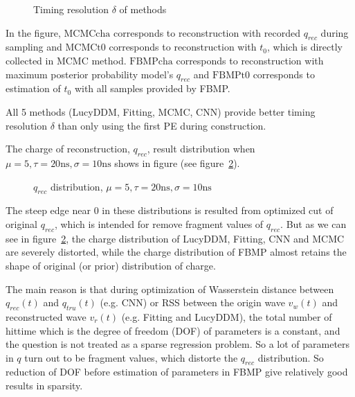 \begin{figure}[H]
    \centering
    \resizebox{\textwidth}{!}{}
    \caption{\label{fig:deltamethods} Timing resolution $\delta$ of methods}
\end{figure}

In the figure, $\mathrm{MCMCcha}$ corresponds to reconstruction with recorded $q_{rec}$ during sampling and $\mathrm{MCMCt0}$ corresponds to reconstruction with $t_{0}$, which is directly collected in MCMC method. $\mathrm{FBMPcha}$ corresponds to reconstruction with maximum posterior probability model's $q_{rec}$ and $\mathrm{FBMPt0}$ corresponds to estimation of $t_{0}$ with all samples provided by FBMP. 

All 5 methods (LucyDDM, Fitting, MCMC, CNN) provide better timing resolution $\delta$ than only using the first PE during construction. 


The charge of reconstruction, $q_{rec}$, result distribution when $\mu=5, \tau=20\mathrm{ns}, \sigma=10\mathrm{ns}$ shows in figure (see figure~\ref{fig:recchargehist}). 

\begin{figure}[H]
    \centering
    \resizebox{\textwidth}{!}{}
    \caption{\label{fig:recchargehist}  $q_{rec}$ distribution, $\mu=5, \tau=20\mathrm{ns}, \sigma=10\mathrm{ns}$}
\end{figure}

The steep edge near 0 in these distributions is resulted from optimized cut of original $q_{rec}$, which is intended for remove fragment values of $q_{rec}$. But as we can see in figure~\ref{fig:recchargehist}, the charge distribution of LucyDDM, Fitting, CNN and MCMC are severely distorted, while the charge distribution of FBMP almost retains the shape of original (or prior) distribution of charge. 

The main reason is that during optimization of Wasserstein distance between $q_{rec}(t)$ and $q_{tru}(t)$ (e.g. CNN) or RSS between the origin wave $v_{w}(t)$ and reconstructed wave $v_{r}(t)$ (e.g. Fitting and LucyDDM), the total number of hittime which is the degree of freedom (DOF) of parameters is a constant, and the question is not treated as a sparse regression problem. So a lot of parameters in $q$ turn out to be fragment values, which distorte the $q_{rec}$ distribution. So reduction of DOF before estimation of parameters in FBMP give relatively good results in sparsity. 

